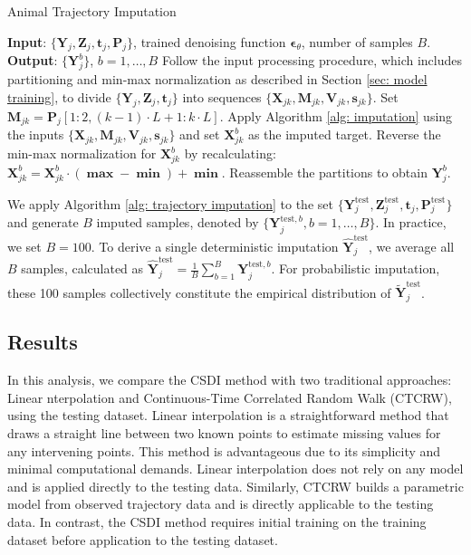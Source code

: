 \documentclass[11pt]{article}
\begin{document}
\begin{algorithm}
\caption{Animal Trajectory Imputation}\label{alg: trajectory imputation}
\begin{algorithmic}[1]
\State \textbf{Input}: $\{\bm{Y}_j, \bm{Z}_j, \bm{t}_j, \bm{P}_j\}$, trained denoising function $\bm{\epsilon}_{\theta}$, number of samples $B$.
\State \textbf{Output}: $\{\bm{Y}_j^b\}$, $b=1,\ldots, B$
    \State Follow the input processing procedure, which includes partitioning and min-max normalization as described in Section \ref{sec: model training}, to divide $\{\bm{Y}_j, \bm{Z}_j, \bm{t}_j\}$ into sequences $\{\bm{X}_{jk}, \bm{M}_{jk}, \bm{V}_{jk}, \bm{s}_{jk}\}$.
    	\State Set $\bm{M}_{jk} = \bm{P}_j[1:2, (k-1) \cdot L+1 : k \cdot L]$.
        \State Apply Algorithm \ref{alg: imputation} using the inputs $\{\bm{X}_{jk}, \bm{M}_{jk}, \bm{V}_{jk}, \bm{s}_{jk}\}$ and set $\bm{X}_{jk}^b$ as the imputed target.
        \State Reverse the min-max normalization for $\bm{X}_{jk}^b$ by recalculating: $\bm{X}_{jk}^b = \bm{X}_{jk}^b \cdot (\bm{\max} - \bm{\min}) + \bm{\min}$.
    \EndFor
    \State Reassemble the partitions to obtain $\bm{Y}_j^b$.
\EndFor
\end{algorithmic}
\end{algorithm}

We apply Algorithm \ref{alg: trajectory imputation} to the set $\{\bm{Y}_j^{\mathrm{test}}, \bm{Z}_j^{\mathrm{test}}, \bm{t}_j, \bm{P}_j^{\mathrm{test}}\}$ and generate $B$ imputed samples, denoted by $\{\bm{Y}_j^{\mathrm{test},b}, b=1,\ldots, B\}$. In practice, we set $B=100$. To derive a single deterministic imputation $\hat{\bm{Y}}_j^{\mathrm{test}}$, we average all $B$ samples, calculated as $\hat{\bm{Y}}_j^{\mathrm{test}} = \frac{1}{B}\sum_{b=1}^B \bm{Y}_j^{\mathrm{test},b}$. For probabilistic imputation, these 100 samples collectively constitute the empirical distribution of $\tilde{\bm{Y}}_j^{\mathrm{test}}$.



\subsection{Results}
In this analysis, we compare the CSDI method with two traditional approaches: Linear nterpolation and Continuous-Time Correlated Random Walk (CTCRW), using the testing dataset. Linear interpolation is a straightforward method that draws a straight line between two known points to estimate missing values for any intervening points. This method is advantageous due to its simplicity and minimal computational demands. Linear interpolation does not rely on any model and is applied directly to the testing data. Similarly, CTCRW builds a parametric model from observed trajectory data and is directly applicable to the testing data. In contrast, the CSDI method requires initial training on the training dataset before application to the testing dataset.
\end{document}
